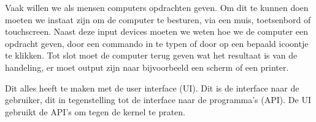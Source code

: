 Vaak willen we als mensen computers opdrachten geven. Om dit te kunnen doen moeten we instaat zijn om de computer te besturen, via een muis, toetsenbord of touchscreen. Naast deze input devices moeten we weten hoe we de computer een opdracht geven, door een commando in te typen of door op een bepaald icoontje te klikken. Tot slot moet de computer terug geven wat het resultaat is van de handeling, er moet output zijn naar bijvoorbeeld een scherm of een printer.

Dit alles heeft te maken met de user interface (UI). Dit is de interface naar de gebruiker, dit in tegenstelling tot de interface naar de programma's (API). De UI gebruikt de API's om tegen de kernel te praten.

